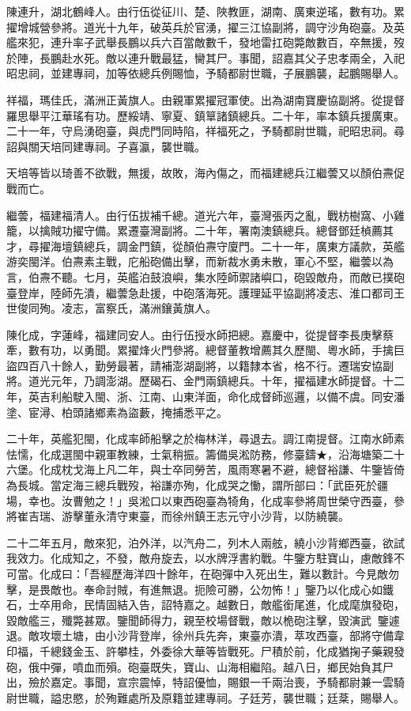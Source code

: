 \begin{pinyinscope}
陳連升，湖北鶴峰人。由行伍從征川、楚、陜教匪，湖南、廣東逆瑤，數有功。累擢增城營參將。道光十九年，破英兵於官湧，擢三江協副將，調守沙角砲臺。及英艦來犯，連升率子武舉長鵬以兵六百當敵數千，發地雷扛砲斃敵數百，卒無援，歿於陣，長鵬赴水死。敵以連升戰最猛，臠其尸。事聞，詔嘉其父子忠孝兩全，入祀昭忠祠，並建專祠，加等依總兵例賜恤，予騎都尉世職，子展鵬襲，起鵬賜舉人。

祥福，瑪佳氏，滿洲正黃旗人。由親軍累擢冠軍使。出為湖南寶慶協副將。從提督羅思舉平江華瑤有功。歷綏靖、寧夏、鎮筸諸鎮總兵。二十年，率本鎮兵援廣東。二十一年，守烏湧砲臺，與虎門同時陷，祥福死之，予騎都尉世職，祀昭忠祠。尋詔與關天培同建專祠。子喜瀛，襲世職。

天培等皆以琦善不欲戰，無援，故敗，海內傷之，而福建總兵江繼蕓又以顏伯燾促戰而亡。

繼蕓，福建福清人。由行伍拔補千總。道光六年，臺灣張丙之亂，戰枋樹窩、小雞籠，以擒賊功擢守備。累遷臺灣副將。二十年，署南澳鎮總兵。總督鄧廷楨薦其才，尋擢海壇鎮總兵，調金門鎮，從顏伯燾守廈門。二十一年，廣東方議款，英艦游奕閩洋。伯燾素主戰，庀船砲備出擊，而新裁水勇未散，軍心不堅，繼蕓以為言，伯燾不聽。七月，英艦泊鼓浪嶼，集水陸師禦諸嶼口，砲毀敵舟，而敵已撲砲臺登岸，陸師先潰，繼蕓急赴援，中砲落海死。護理延平協副將凌志、淮口都司王世俊同殉。凌志，富察氏，滿洲鑲黃旗人。

陳化成，字蓮峰，福建同安人。由行伍授水師把總。嘉慶中，從提督李長庚擊蔡牽，數有功，以勇聞。累擢烽火門參將。總督董教增薦其久歷閩、粵水師，手擒巨盜四百八十餘人，勤勞最著，請補澎湖副將，以籍隸本省，格不行。遷瑞安協副將。道光元年，乃調澎湖。歷碣石、金門兩鎮總兵。十年，擢福建水師提督。十二年，英吉利船駛入閩、浙、江南、山東洋面，命化成督師巡邏，以備不虞。同安潘塗、宦潯、柏頭諸鄉素為盜藪，掩捕悉平之。

二十年，英艦犯閩，化成率師船擊之於梅林洋，尋退去。調江南提督。江南水師素怯懦，化成選閩中親軍教練，士氣稍振。籌備吳淞防務，修臺鑄★，沿海塘築二十六堡。化成枕戈海上凡二年，與士卒同勞苦，風雨寒暑不避，總督裕謙、牛鑒皆倚為長城。當定海三總兵戰歿，裕謙亦殉，化成哭之慟，謂所部曰：「武臣死於疆場，幸也。汝曹勉之！」吳淞口以東西砲臺為犄角，化成率參將周世榮守西臺，參將崔吉瑞、游擊董永清守東臺，而徐州鎮王志元守小沙背，以防繞襲。

二十二年五月，敵來犯，泊外洋，以汽舟二，列木人兩舷，繞小沙背鄉西臺，欲試我效力。化成知之，不發，敵舟旋去，以水牌浮書約戰。牛鑒方駐寶山，慮敵鋒不可當。化成曰：「吾經歷海洋四十餘年，在砲彈中入死出生，難以數計。今見敵勿擊，是畏敵也。奉命討賊，有進無退。扼險可勝，公勿怖！」鑒乃以化成心如鐵石，士卒用命，民情固結入告，詔特嘉之。越數日，敵艦銜尾進，化成麾旗發砲，毀敵艦三，殲斃甚眾。鑒聞師得力，親至校場督戰，敵以桅砲注擊，毀演武，鑒遽退。敵攻壞土塘，由小沙背登岸，徐州兵先奔，東臺亦潰，萃攻西臺，部將守備韋印福，千總錢金玉、許攀桂，外委徐大華等皆戰死。尸積於前，化成猶掬子藥親發砲，俄中彈，噴血而殞。砲臺既失，寶山、山海相繼陷。越八日，鄉民始負其尸出，殮於嘉定。事聞，宣宗震悼，特詔優恤，賜銀一千兩治喪，予騎都尉兼一雲騎尉世職，謚忠愍，於殉難處所及原籍並建專祠。子廷芳，襲世職；廷棻，賜舉人。


\end{pinyinscope}
